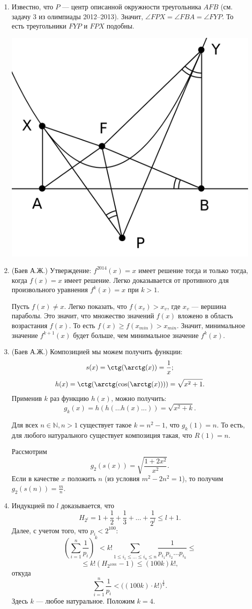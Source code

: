 \begin{enumerate}
\item Известно, что $P$ --- центр описанной окружности треугольника $AFB$ (см. задачу 3 из олимпиады 2012--2013). Значит, $\angle FPX = \angle FBA = \angle FYP$. То есть треугольники $FYP$  и $FPX$ подобны.
\begin{center}
\includegraphics[width=0.5\linewidth]{solution/pictures/2013-2014-bonus-6}
\end{center}

\item (Баев А.Ж.) Утверждение: $f^{2014}(x) = x$ имеет решение тогда и только тогда, когда $f(x) = x$ имеет решение. Легко доказывается от противного для произвольного уравнения $f^k(x) = x$ при $k>1$.

Пусть $f(x) \neq x$. Легко показать, что $f(x_v) > x_v$, где $x_v$ --- вершина параболы. Это значит, что множество значений $f(x)$ вложено в область возрастания $f(x)$. То есть $f(x) \geqslant f(x_{min}) > x_{min}$. Значит, минимальное значение $f^{k+1}(x)$ будет больше, чем минимальное значение $f^{k}(x)$.

\item (Баев А.Ж.) Композицией мы можем получить функции:
$$s(x) = \ctg (\arctg (x) ) = \frac{1}{x};$$
$$h(x) = \ctg (\arctg ( \cos ( \arctg(x) ) ) ) = \sqrt{x^2+1}.$$
Применив $k$ раз функцию $h(x)$, можно получить:
$$g_k(x) = h(h( ... h(x) ... )) = \sqrt{x^2 + k}.$$

Для всех $n \in \mathbb{N}, n > 1$ существует такое $k = n^2-1$, что $g_k(1) = n$. То есть, для любого натурального существует композиция такая, что  $R(1) = n$.

Рассмотрим 
$$g_2(s(x)) = \sqrt{\frac{1+2x^2}{x^2}}.$$
Если в качестве $x$ положить $n$ (из условия $m^2 - 2n^2 = 1$), то получим $g_2(s(n)) = \frac{m}{n}$.

\item Индукцией по $l$ доказывается, что
$$H_{2^l} = 1 + \frac{1}{2} + \frac{1}{3} + \hdots + \frac{1}{2^l} \leqslant l + 1.$$
Далее, с учетом того, что $p_i < 2^{100}$:
$$\left( \sum_{i=1}^{n} \frac{1}{p_i} \right)^k < k! \sum_{1 \leqslant i_1 \leqslant \hdots \leqslant i_n \leqslant n} \frac{1}{p_{i_1} p_{i_2} \hdots p_{i_k}} \leqslant $$
$$ \leqslant k! ( H_{2^{100k}} - 1) \leqslant (100 k) k!,$$
откуда
$$\sum_{i=1}^{n} \frac{1}{p_i} < \bigl( (100 k) \cdot k! \bigr) ^{\frac{1}{k}}.$$
Здесь $k$ --- любое натуральное. Положим $k = 4$.
\end{enumerate}

